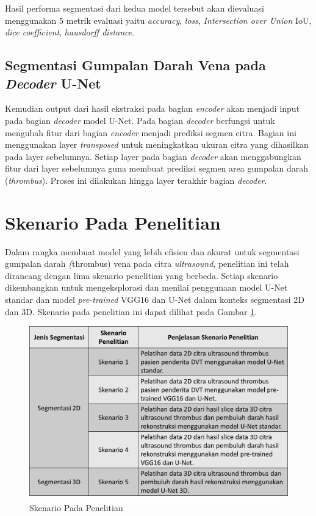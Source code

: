 {Hasil performa segmentasi dari kedua model tersebut akan dievaluasi menggunakan 5 metrik evaluasi yaitu \textit{accuracy}, \textit{loss}, \textit{Intersection over Union} IoU, \textit{dice coefficient}, \textit{hausdorff distance}.

\subsection{Segmentasi Gumpalan Darah Vena pada \textit{Decoder} U-Net}
Kemudian output dari hasil ekstraksi pada bagian \textit{encoder} akan menjadi input pada bagian \textit{decoder} model U-Net. Pada bagian \textit{decoder} berfungsi untuk mengubah fitur dari bagian \textit{encoder} menjadi prediksi segmen citra. Bagian ini menggunakan layer \textit{transposed} untuk meningkatkan ukuran citra yang dihasilkan pada layer sebelumnya. Setiap layer pada bagian \textit{decoder} akan menggabungkan fitur dari layer sebelumnya guna membuat prediksi segmen area gumpalan darah (\textit{thrombus}). Proses ini dilakukan hingga layer terakhir bagian \textit{decoder}.

\section{Skenario Pada Penelitian}

Dalam rangka membuat model yang lebih efisien dan akurat untuk segmentasi gumpalan darah \textit(thrombus) vena pada citra \textit{ultrasound}, penelitian ini telah dirancang dengan lima skenario penelitian yang berbeda. Setiap skenario dikembangkan untuk mengeksplorasi dan menilai penggunaan model U-Net standar dan model \textit{pre-trained} VGG16 dan U-Net dalam konteks segmentasi 2D dan 3D. Skenario pada penelitian ini dapat dilihat pada Gambar \ref{fig:skenario_penelitian}.


\begin{figure}[htbp]
	\centering
	\includegraphics[scale= 0.2]{bab3/skenario_penelitian.png}
	\caption{Skenario Pada Penelitian}
	\label{fig:skenario_penelitian}
\end{figure}

}
